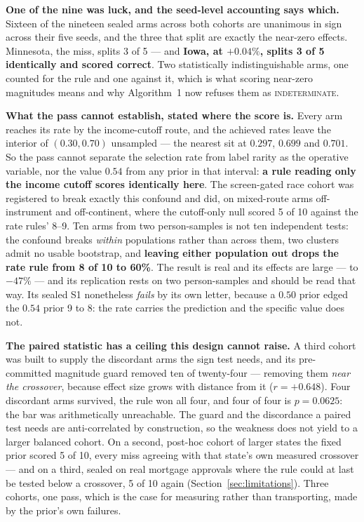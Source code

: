 \documentclass[conference]{IEEEtran}
\begin{document}
\textbf{One of the nine was luck, and the seed-level accounting says which.} Sixteen of the
nineteen sealed arms across both cohorts are unanimous in sign across their five seeds, and
the three that split are exactly the near-zero effects. Minnesota, the miss, splits 3 of 5 ---
and \textbf{Iowa, at $+0.04\%$, splits 3 of 5 identically and scored correct}. Two
statistically indistinguishable arms, one counted for the rule and one against it, which is
what scoring near-zero magnitudes means and why Algorithm~1 now refuses them as
\textsc{indeterminate}.

\textbf{What the pass cannot establish, stated where the score is.} Every arm reaches its rate
by the income-cutoff route, and the achieved rates leave the interior of $(0.30, 0.70)$
unsampled --- the nearest sit at $0.297$, $0.699$ and $0.701$. So the pass cannot separate the
selection rate from label rarity as the operative variable, nor the value $0.54$ from any
prior in that interval: \textbf{a rule reading only the income cutoff scores identically
here}. The screen-gated race cohort was registered to break exactly this confound and did, on
mixed-route arms off-instrument and off-continent, where the cutoff-only null scored 5 of 10
against the rate rules' 8--9. Ten arms from two person-samples is not ten independent tests:
the confound breaks \emph{within} populations rather than across them, two clusters admit no
usable bootstrap, and \textbf{leaving either population out drops the rate rule from 8 of 10
to 60\%}. The result is real and its effects are large --- to $-47\%$ --- and its replication
rests on two person-samples and should be read that way. Its sealed S1 nonetheless \emph{fails} by its own
letter, because a $0.50$ prior edged the $0.54$ prior 9 to 8: the rate carries the prediction
and the specific value does not.

\textbf{The paired statistic has a ceiling this design cannot raise.} A third cohort was built
to supply the discordant arms the sign test needs, and its pre-committed magnitude guard
removed ten of twenty-four --- removing them \emph{near the crossover}, because effect size
grows with distance from it ($r = +0.648$). Four discordant arms survived, the rule won all
four, and four of four is $p = 0.0625$: the bar was arithmetically unreachable. The guard and
the discordance a paired test needs are anti-correlated by construction, so the weakness does
not yield to a larger balanced cohort. On a second, post-hoc cohort of larger states the fixed prior scored 5 of 10, every miss
agreeing with that state's own measured crossover --- and on a third, sealed on real mortgage
approvals where the rule could at last be tested below a crossover, 5 of 10 again
(Section~\ref{sec:limitations}). Three cohorts, one pass, which is the case for measuring
rather than transporting, made by the prior's own failures.
\end{document}
